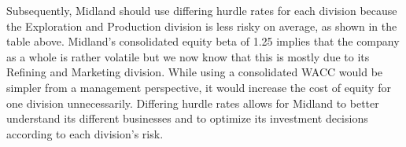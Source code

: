 \documentclass[letterpaper]{article}
\begin{document}
Subsequently, Midland should use differing hurdle rates for each division because the Exploration and Production division is less risky on average, as shown in the table above. Midland's consolidated equity beta of 1.25 implies that the company as a whole is rather volatile but we now know that this is mostly due to its Refining and Marketing division. While using a consolidated WACC would be simpler from a management perspective, it would increase the cost of equity for one division unnecessarily. Differing hurdle rates allows for Midland to better understand its different businesses and to optimize its investment decisions according to each division's risk. 
\end{document}
